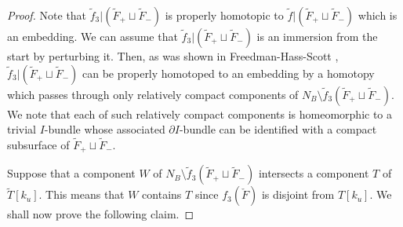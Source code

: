 \documentclass{amsart}
\theoremstyle{definition}
\numberwithin{figure}{section}
\numberwithin{equation}{section}
\def\cv{\mathcal{V}}
\begin{document}
\begin{proof}
Note that  $\tilde f_3|(\tilde F_+ \sqcup \tilde F_-)$ is properly homotopic to $\tilde f|(\tilde F_+ \sqcup \tilde F_-)$ which is an embedding.
We can assume that $\tilde f_3|(\tilde F_+ \sqcup \tilde F_-)$ is an immersion from the start by perturbing it.
Then, as was shown in Freedman-Hass-Scott \cite{fhs}, $\tilde f_3|(\tilde F_+ \sqcup \tilde F_-)$ can be properly homotoped to an embedding by a homotopy which passes through only relatively compact components of $N_B \setminus \tilde f_3(\tilde F_+ \sqcup \tilde F_-)$.
We note that each of such relatively compact components is homeomorphic to a trivial $I$-bundle whose  associated $\partial I$-bundle can be identified with a compact subsurface of $\tilde F_+ \sqcup \tilde F_-$.

Suppose that  a component $W$ of $N_B \setminus \tilde f_3(\tilde F_+ \sqcup \tilde F_-)$ intersects a component $T$ of $\tilde T[k_u]$.
This means that $W$ contains $T$ since $f_3(\check F)$ is disjoint from $T[k_u]$.
We shall now prove the following claim.


\end{proof}
\end{document}
